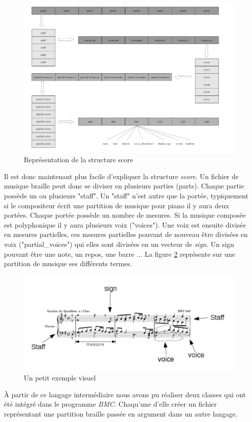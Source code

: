 \begin{figure}[h]
  \centering
  \includegraphics[width=1\textwidth]{images/bmc-score.png}
  \caption{Représentation de la structure score}
  \label{score}
\end{figure}

Il est donc maintenant plus facile d'expliquer la structure
\textit{score}. Un fichier de musique braille peut donc se diviser en
plusieurs parties (parts). Chaque partie possède un ou plusieurs
"staff". Un "staff" n'est autre que la portée, typiquement si le
compositeur écrit une partition de musique pour piano il y aura deux
portées. Chaque portée possède un nombre de mesures. Si la musique
composée est polyphonique il y aura plusieurs voix ("voices"). Une
voix est ensuite divisée en mesures partielles, ces mesures partielles
pouvant de nouveau être divisées en voix ("partial\_voices") qui elles
sont divisées en un vecteur de \textit{sign}. Un sign pouvant être une
note, un repos, une barre ... La figure \ref{musicexe} représente sur
une partition de musique ses différents termes.


\begin{figure}[!h]
  \includegraphics[width=1\textwidth]{images/score-visu.png}
  \caption{Un petit exemple visuel}
  \label{musicexe}
\end{figure}

À partir de ce langage intermédiaire nous avons pu réaliser deux
classes qui ont été intégré dans le programme \textit{BMC}. Chaqu'une d'elle
créer un fichier représentant une partition braille passée en argument
dans un autre langage.



